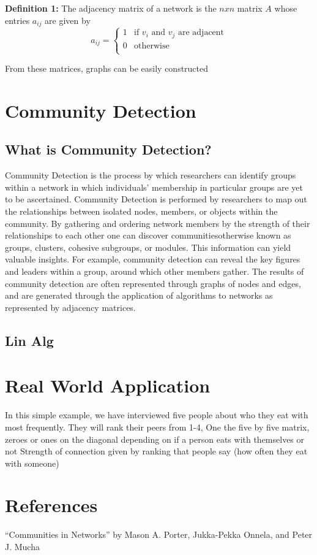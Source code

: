 \documentclass{article}
\begin{document}
\textbf{Definition 1:} The adjacency matrix of a network is the $n x n$ matrix $A$ whose entries $a_{ij}$ are given by
\[   
a_{ij} = 
     \begin{cases}
       1 & \text{if } v_i \text{ and } v_j \text{ are adjacent} \\
       0 & \text{otherwise} \\
     \end{cases}
\]

From these matrices, graphs can be easily constructed 

\section{Community Detection}

\subsection{What is Community Detection?}

Community Detection is the process by which researchers can identify groups within a network in which individuals' membership in particular groups are yet to be ascertained. 
Community Detection is performed by researchers to map out the relationships between isolated nodes, members, or objects within the community. 
By gathering and ordering network members by the strength of their relationships to each other one can discover communities\textemdash otherwise known as groups, clusters, cohesive subgroups, or modules. 
This information can yield valuable insights. For example, community detection can reveal the key figures and leaders within a group, around which other members gather.
The results of community detection are often represented through graphs of nodes and edges, and are generated through the application of algorithms to networks as represented by adjacency matrices.


\subsection{Lin Alg}

\section{Real World Application}
In this simple example, we have interviewed five people about who they eat with most frequently. They will rank their peers from 1-4, 
One the five by five matrix, zeroes or ones on the diagonal depending on if a person eats with themselves or not
Strength of connection given by ranking that people say (how often they eat with someone)

\section*{References}
“Communities in Networks” by Mason A. Porter, Jukka-Pekka Onnela, and Peter J. Mucha
\end{document}

